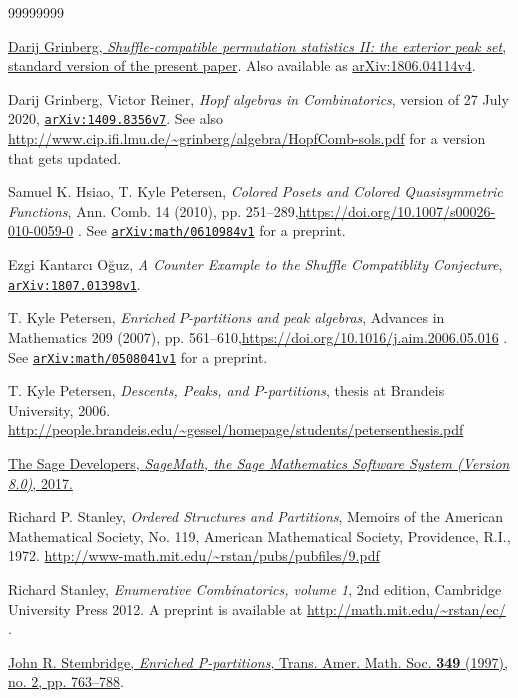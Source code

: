 \documentclass[numbers=enddot,12pt,final,onecolumn,notitlepage]{scrartcl}%
\theoremstyle{definition}
\newenvironment{verlong}{}{}
\newcommand\arxiv[1]{\href{http://www.arxiv.org/abs/#1}{\texttt{arXiv:#1}}}
\begin{document}
\begin{thebibliography}{99999999}
\begin{verlong}


%
\href{http://www.cip.ifi.lmu.de/~grinberg/algebra/gzshuf2.pdf}{Darij Grinberg,
\textit{Shuffle-compatible permutation statistics II: the exterior peak set},
standard version of the present paper}. Also available as
\href{https://arxiv.org/abs/1806.04114v4}{arXiv:1806.04114v4}.
\end{verlong}

Darij Grinberg, Victor Reiner, \textit{Hopf
algebras in Combinatorics}, version of 27 July 2020,
\texttt{\href{http://www.arxiv.org/abs/1409.8356v7}{arXiv:1409.8356v7}}.
\newline See also
\url{http://www.cip.ifi.lmu.de/~grinberg/algebra/HopfComb-sols.pdf} for a
version that gets updated.

Samuel K. Hsiao, T. Kyle Petersen, \textit{Colored
Posets and Colored Quasisymmetric Functions}, Ann. Comb. 14 (2010), pp.
251--289,\newline\url{https://doi.org/10.1007/s00026-010-0059-0} . See
\href{http://www.arxiv.org/abs/math/0610984v1}{\texttt{arXiv:math/0610984v1}}
for a preprint.

Ezgi Kantarc{\i} O\u{g}uz,
\textit{A Counter Example to the Shuffle Compatiblity Conjecture},
\arxiv{1807.01398v1}.

T. Kyle Petersen, \textit{Enriched }$\mathit{P}%
$\textit{-partitions and peak algebras}, Advances in Mathematics 209 (2007),
pp. 561--610,\newline\url{https://doi.org/10.1016/j.aim.2006.05.016} . See
\texttt{\href{https://arxiv.org/abs/math/0508041v1}{arXiv:math/0508041v1}} for
a preprint.

T. Kyle Petersen,
\textit{Descents, Peaks, and $P$-partitions},
thesis at Brandeis University,
2006.
\url{http://people.brandeis.edu/~gessel/homepage/students/petersenthesis.pdf}

\href{http://www.sagemath.org}{The Sage
Developers, \textit{SageMath, the Sage Mathematics Software System (Version
8.0)}, 2017.}

Richard P. Stanley, \textit{Ordered Structures and
Partitions}, Memoirs of the American Mathematical Society, No. 119, American
Mathematical Society, Providence, R.I., 1972. \newline
\url{http://www-math.mit.edu/~rstan/pubs/pubfiles/9.pdf}

Richard Stanley, \textit{Enumerative
Combinatorics, volume 1}, 2nd edition, Cambridge University Press 2012. A
preprint is available at \url{http://math.mit.edu/~rstan/ec/} .

%
\href{https://doi.org/10.1090/S0002-9947-97-01804-7}{John
R. Stembridge, \textit{Enriched P-partitions}, Trans. Amer. Math. Soc.
\textbf{349} (1997), no. 2, pp. 763--788}.
\end{thebibliography}
\end{document}

